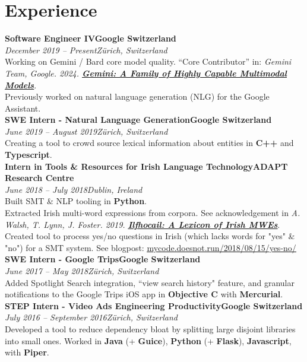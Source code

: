 \documentclass[a4paper, oneside, final]{scrartcl}
\newcommand{\nasc}[2]{\href{#1}{\color{blue}\setulcolor{blue}\ul{#2}}}
\newcommand{\bearna}[0]{\vspace{2.25mm}\\}
\newcommand{\fmtdate}[1]{\textit{#1}}
\newcommand{\fmtaddress}[1]{\textit{#1}}
\newcommand{\fmtjobtitle}[1]{\textbf{#1}}
\newcommand{\fmtskill}[1]{\textbf{#1}}
\begin{document}
\section{Experience}
\fmtjobtitle{Software Engineer IV\hfill Google Switzerland}\\
\fmtdate{December 2019 -- Present}\hfill\fmtaddress{Zürich, Switzerland}\\
Working on Gemini / Bard core model quality. ``Core Contributor'' in: \textit{Gemini Team, Google. 2024. \textbf{\nasc{https://storage.googleapis.com/deepmind-media/gemini/gemini_1_report.pdf}{Gemini: A Family of Highly Capable Multimodal Models}}}.
\bearna
Previously worked on natural language generation (NLG) for the Google Assistant.
\bearna
\fmtjobtitle{SWE Intern - Natural Language Generation\hfill Google Switzerland}\\
\fmtdate{June 2019 -- August 2019}\hfill\fmtaddress{Zürich, Switzerland}\\
Creating a tool to crowd source lexical information about entities in \fmtskill{C++} and \fmtskill{Typescript}.
\bearna
\fmtjobtitle{Intern in Tools \& Resources for Irish Language Technology\hfill ADAPT Research Centre}\\
\fmtdate{June 2018 -- July 2018}\hfill\fmtaddress{Dublin, Ireland}\\
Built SMT \& NLP tooling in \fmtskill{Python}.
\bearna
Extracted Irish multi-word expressions from corpora. See acknowledgement in \textit{A. Walsh, T. Lynn, J. Foster. 2019. \textbf{\nasc{https://aclanthology.org/W19-5120.pdf}{Ilfhocail: A Lexicon of Irish MWEs}}}.
\bearna
Created tool to process yes/no questions in Irish (which lacks words for "yes" \& "no") for a SMT system. See blogpost: \nasc{http://mycode.doesnot.run/2018/08/15/yes-no/}{mycode.doesnot.run/2018/08/15/yes-no/}
\bearna
\fmtjobtitle{SWE Intern - Google Trips\hfill Google Switzerland}\\
\fmtdate{June 2017 -- May 2018}\hfill\fmtaddress{Zürich, Switzerland}\\
Added Spotlight Search integration, ``view search history" feature, and granular notifications to the Google Trips iOS app in \fmtskill{Objective C} with \fmtskill{Mercurial}.
\bearna
\fmtjobtitle{STEP Intern - Video Ads Engineering Productivity\hfill Google Switzerland}\\
\fmtdate{July 2016 -- September 2016}\hfill\fmtaddress{Zürich, Switzerland}\\
Developed a tool to reduce dependency bloat by splitting large disjoint libraries into small ones. Worked in \fmtskill{Java} (+ \fmtskill{Guice}), \fmtskill{Python} (+ \fmtskill{Flask}), \fmtskill{Javascript}, with \fmtskill{Piper}.
\end{document}
